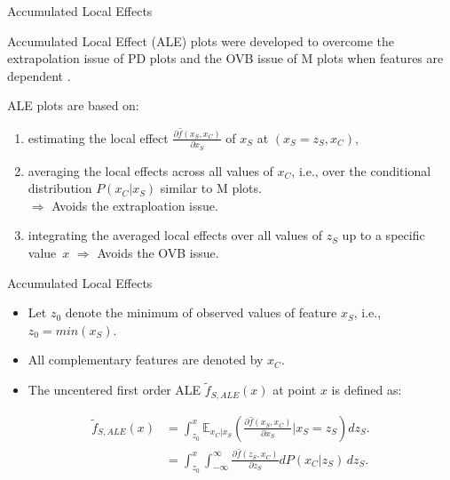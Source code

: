 \documentclass[aspectratio=169]{../latex_main/tntbeamer}  %
\begin{document}
\begin{frame}{Accumulated Local Effects}

Accumulated Local Effect (ALE) plots were developed to overcome the extrapolation issue of PD plots and the OVB issue of M plots when features are dependent .

\pause
\medskip
ALE plots are based on:
\begin{enumerate}
\item estimating the local effect $\frac{\partial \hat{f}(x_S, x_C)}{\partial x_S}$ of $x_S$ at $(x_S = z_S, x_C)$,
\pause
\item averaging the local effects across all values of $x_C$, i.e., over the conditional distribution $P(x_C|x_S)$ similar to M plots.\\
$\Rightarrow$ Avoids the extraploation issue.
\pause
\item integrating the averaged local effects over all values of $z_S$ up to a specific value~$x$ $\Rightarrow$ Avoids the OVB issue.
\end{enumerate}

\end{frame}


\begin{frame}{Accumulated Local Effects}

\begin{itemize}
    \item Let $z_0$ denote the minimum of observed values of feature $x_S$, i.e., $z_0 = min(x_S)$.
    \item All complementary features are denoted by $x_C$.
    \item The uncentered first order ALE $\tilde{f}_{S, ALE}(x)$ at point $x$ is defined as:
\end{itemize}

$$
\begin{aligned}
\tilde{f}_{S, ALE}(x) &= \int_{z_{0}}^{x} \mathbb{E}_{x_C \vert x_S} \left(\frac{\partial \hat{f}(x_S, x_C)}{\partial x_S} \bigg \vert x_S = z_S \right) dz_S. \\
&= \int_{z_{0}}^{x} \int_{-\infty}^{\infty}  \frac{\partial \hat{f}(z_S, x_C)}{\partial z_S} d P(x_C | z_S) \, dz_S.
\end{aligned}
$$

\end{frame}
\end{document}
